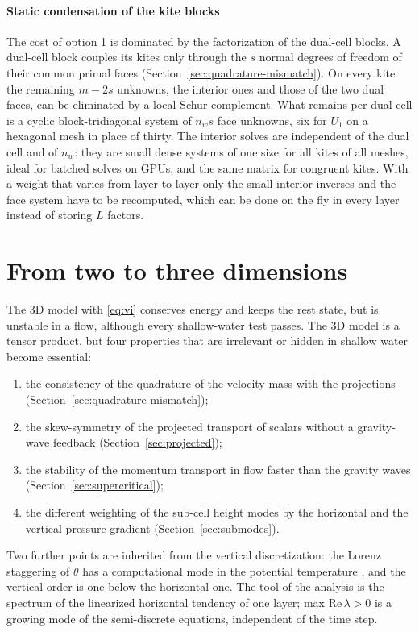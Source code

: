 \documentclass[preprint,12pt]{elsarticle}
\theoremstyle{definition}
\begin{document}
\paragraph{Static condensation of the kite blocks} The cost of option 1 is dominated by the factorization of
the dual-cell blocks. A dual-cell block couples its kites only through the $s$ normal degrees of freedom of
their common primal faces (Section~\ref{sec:quadrature-mismatch}). On every kite the remaining
$m - 2s$ unknowns, the interior ones and those of the two dual faces, can be eliminated by a local Schur
complement. What remains per dual cell is a cyclic block-tridiagonal system of $n_w s$ face unknowns, six for
$U_1$ on a hexagonal mesh in place of thirty. The interior solves are independent of the dual cell and of $n_w$:
they are small dense systems of one size for all kites of all meshes, ideal for batched solves on GPUs,
and the same matrix for congruent kites. With a weight that varies from layer to layer only the small
interior inverses and the face system have to be recomputed, which can be done on the fly in every layer
instead of storing $L$ factors.

\section{From two to three dimensions}\label{sec:2d3d}

The 3D model with \eqref{eq:vi} conserves energy and keeps the rest state, but is unstable in a flow,
although every shallow-water test passes. The 3D model is a tensor product, but four properties that are
irrelevant or hidden in shallow water become essential:
\begin{enumerate}
\item the consistency of the quadrature of the velocity mass with the projections
  (Section~\ref{sec:quadrature-mismatch});
\item the skew-symmetry of the projected transport of scalars without a gravity-wave feedback
  (Section~\ref{sec:projected});
\item the stability of the momentum transport in flow faster than the gravity waves
  (Section~\ref{sec:supercritical});
\item the different weighting of the sub-cell height modes by the horizontal and the vertical pressure
  gradient (Section~\ref{sec:submodes}).
\end{enumerate}
Two further points are inherited from the vertical discretization: the Lorenz staggering of $\theta$ has a
computational mode in the potential temperature \cite{ArakawaMoorthi1988,ThuburnWoollings2005}, and the
vertical order is one below the horizontal one. The tool of the analysis is the spectrum of the linearized
horizontal tendency of one layer; max $\mathrm{Re}\,\lambda>0$ is a growing mode of the semi-discrete
equations, independent of the time step.
\end{document}
